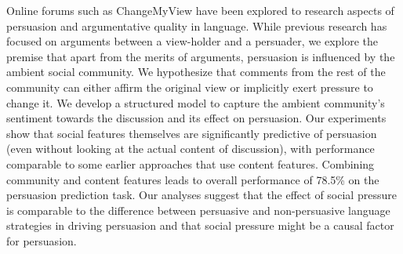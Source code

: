 Online forums such as ChangeMyView have been explored to research aspects of persuasion and argumentative quality in language. While previous research has focused on arguments between a view-holder and a persuader, we explore the premise that apart from the merits of arguments, persuasion is influenced by the ambient social community. We hypothesize that comments from the rest of the community can either affirm the original view or implicitly exert pressure to change it. We develop a structured model to capture the ambient community's sentiment towards the discussion and its effect on persuasion. Our experiments show that social features themselves are significantly predictive of persuasion (even without looking at the actual content of discussion), with performance comparable to some earlier approaches that use content features. Combining community and content features leads to overall performance of 78.5\% on the persuasion prediction task. Our analyses suggest that the effect of social pressure is comparable to the difference between persuasive and non-persuasive language strategies in driving persuasion and that social pressure might be a causal factor for persuasion.
